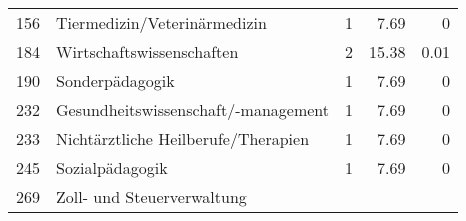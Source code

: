 \begin{longtable}{lXrrr}
     156 &
     \multicolumn{1}{X}{ Tiermedizin/Veterinärmedizin   } &


       \num{1} &
       \num[round-mode=places,round-precision=2]{7,69} &
         \num[round-mode=places,round-precision=2]{0} \\

     184 &
     \multicolumn{1}{X}{ Wirtschaftswissenschaften   } &


       \num{2} &
       \num[round-mode=places,round-precision=2]{15,38} &
         \num[round-mode=places,round-precision=2]{0,01} \\

     190 &
     \multicolumn{1}{X}{ Sonderpädagogik   } &


       \num{1} &
       \num[round-mode=places,round-precision=2]{7,69} &
         \num[round-mode=places,round-precision=2]{0} \\

     232 &
     \multicolumn{1}{X}{ Gesundheitswissenschaft/-management   } &


       \num{1} &
       \num[round-mode=places,round-precision=2]{7,69} &
         \num[round-mode=places,round-precision=2]{0} \\

     233 &
     \multicolumn{1}{X}{ Nichtärztliche Heilberufe/Therapien   } &


       \num{1} &
       \num[round-mode=places,round-precision=2]{7,69} &
         \num[round-mode=places,round-precision=2]{0} \\

     245 &
     \multicolumn{1}{X}{ Sozialpädagogik   } &


       \num{1} &
       \num[round-mode=places,round-precision=2]{7,69} &
         \num[round-mode=places,round-precision=2]{0} \\

     269 &
     \multicolumn{1}{X}{ Zoll- und Steuerverwaltung   } &



\end{longtable}
